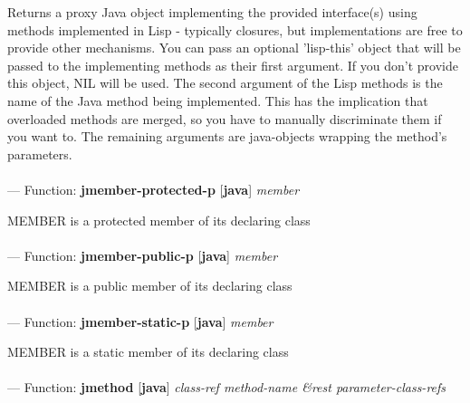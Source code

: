 \begin{adjustwidth}{5em}{5em}
Returns a proxy Java object implementing the provided interface(s) using methods implemented in Lisp - typically closures, but implementations are free to provide other mechanisms. You can pass an optional 'lisp-this' object that will be passed to the implementing methods as their first argument. If you don't provide this object, NIL will be used. The second argument of the Lisp methods is the name of the Java method being implemented. This has the implication that overloaded methods are merged, so you have to manually discriminate them if you want to. The remaining arguments are java-objects wrapping the method's parameters.
\end{adjustwidth}

\paragraph{}
\label{JAVA:JMEMBER-PROTECTED-P}
--- Function: \textbf{jmember-protected-p} [\textbf{java}] \textit{member}

\begin{adjustwidth}{5em}{5em}
MEMBER is a protected member of its declaring class
\end{adjustwidth}

\paragraph{}
\label{JAVA:JMEMBER-PUBLIC-P}
--- Function: \textbf{jmember-public-p} [\textbf{java}] \textit{member}

\begin{adjustwidth}{5em}{5em}
MEMBER is a public member of its declaring class
\end{adjustwidth}

\paragraph{}
\label{JAVA:JMEMBER-STATIC-P}
--- Function: \textbf{jmember-static-p} [\textbf{java}] \textit{member}

\begin{adjustwidth}{5em}{5em}
MEMBER is a static member of its declaring class
\end{adjustwidth}

\paragraph{}
\label{JAVA:JMETHOD}
--- Function: \textbf{jmethod} [\textbf{java}] \textit{class-ref method-name \&rest parameter-class-refs}

